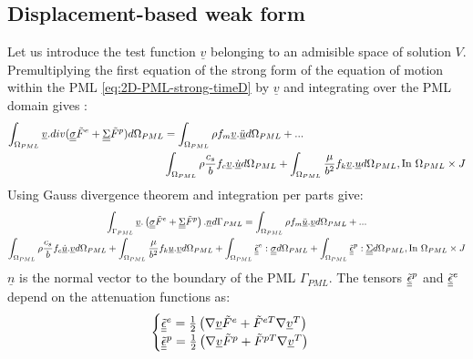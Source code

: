 \subsection{Displacement-based weak form}
Let us introduce the test function $\underline{v}$ belonging to an admisible space of solution $V$. Premultiplying the first equation of the strong form of the equation of motion within the PML \ref{eq:2D-PML-strong-timeD} by $\underline{v}$ and integrating over the PML domain gives :
\begin{align}
\int_{\Omega_{PML}} \underline{v}.div(\underline{\underline{\sigma}}\tilde{F}^e + \underline{\underline{\Sigma}}\tilde{F}^p) d\Omega_{PML} & = \int_{\Omega_{PML}} \rho f_m \underline{v}.\underline{\ddot{u}} d\Omega_{PML} + ... \nonumber\\
&  \int_{\Omega_{PML}} \rho \frac{c_s}{b} f_c \underline{v}.\underline{\dot{u}} d\Omega_{PML} +  \int_{\Omega_{PML}} \frac{\mu}{b^2}f_k \underline{v}. \underline{u}  d\Omega_{PML},  \text{In } \Omega_{PML} \times J 
\end{align}
Using Gauss divergence theorem and integration per parts give:
\begin{multline}
\int_{\Gamma_{PML}} \underline{v} .\left(\underline{\underline{\sigma}}\tilde{F}^e + \underline{\underline{\Sigma}}\tilde{F}^p \right).\underline{n} d\Gamma_{PML}  = \int_{\Omega_{PML}} \rho f_m \underline{\ddot{u}} . \underline{v} d\Omega_{PML} + ... \nonumber\\
\int_{\Omega_{PML}} \rho \frac{c_s}{b} f_c \underline{\dot{u}} . \underline{v} d\Omega_{PML} +  \int_{\Omega_{PML}} \frac{\mu}{b^2}f_k \underline{u} . \underline{v} d\Omega_{PML} +\int_{\Omega_{PML}} \underline{\underline{\tilde{\epsilon}}}^e : \underline{\underline{\sigma}} d\Omega_{PML} + \int_{\Omega_{PML}} \underline{\underline{\tilde{\epsilon}}}^p : \underline{\underline{\Sigma}} d\Omega_{PML},  \text{In } \Omega_{PML} \times J 
\label{eq:weak-form-motion}
\end{multline}
$\underline{n}$ is the normal vector to the boundary of the PML $\Gamma_{PML}$. The tensors $\underline{\underline{\tilde{\epsilon}}}^p$ and $\underline{\underline{\tilde{\epsilon}}}^e$ depend on the attenuation functions as:
\begin{equation}
\begin{cases}
\underline{\underline{\tilde{\epsilon}}}^e = \frac{1}{2}\left(\nabla \underline{v} \tilde{F}^e + \tilde{F}^{eT} \nabla \underline{v}^T  \right) \\
\underline{\underline{\tilde{\epsilon}}}^p = \frac{1}{2}\left(\nabla \underline{v} \tilde{F}^p + \tilde{F}^{pT} \nabla \underline{v}^T  \right)
\end{cases}
\label{eq:weak-first-eq}
\end{equation}
